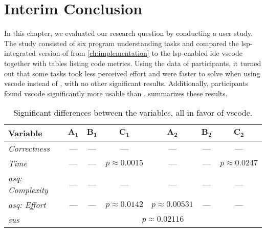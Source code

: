 \documentclass[../thesis]{subfiles}
\begin{document}
\section{Interim Conclusion}
In this chapter, we evaluated our research question by conducting a user study.
The study consisted of six program understanding tasks and compared the \gls{lsp}-integrated version of \SEE{} from \cref{ch:implementation} to the \gls{lsp}-enabled \gls{ide} \gls{vscode} together with tables listing code metrics.
Using the data of \participants participants, it turned out that some tasks took less perceived effort and were faster to solve when using \gls{vscode} instead of \SEE{}, with no other significant results.
Additionally, participants found \gls{vscode} significantly more usable than \SEE{}.
 summarizes these results.

\begin{table*}[htbp]
	\caption{Significant differences between the variables, all in favor of \gls{vscode}.}\label{tab:results}
	\centering
	\begin{tabular}{@{}lcccccc@{}}
		\toprule
		\textbf{Variable}            & $\bm{A_1}$                              & $\bm{B_1}$ & $ \bm{C_1}$        & $\bm{A_2}$          & $\bm{B_2}$ & $\bm{C_2}$         \\\midrule
		\emph{Correctness}           & ---                                     & ---        & ---                & ---                 & ---        & ---                \\
		\emph{Time}                  & ---                                     & ---        & $p \approx 0.0015$ & ---                 & ---        & $p \approx 0.0247$ \\
		\emph{\gls{asq}: Complexity} & ---                                     & ---        & ---                & ---                 & ---        & ---                \\
		\emph{\gls{asq}: Effort}     & ---                                     & ---        & $p \approx 0.0142$ & $p \approx 0.00531$ & ---        & ---                \\
		\emph{\gls{sus}}             & \multicolumn{6}{c}{$p \approx 0.02116$}                                                                                           \\
		\bottomrule
	\end{tabular}
\end{table*}
\end{document}

